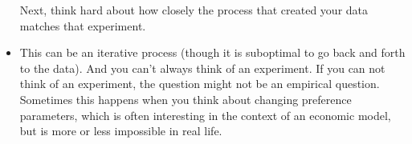 \begin{itemize}[leftmargin=0pt]
  Next, think hard about how closely the process that created your
  data matches that experiment.

\item This can be an iterative process (though it is suboptimal to go
  back and forth to the data).  And you can't always think of an
  experiment.  If you can not think of an experiment, the question
  might not be an empirical question.  Sometimes this happens when you
  think about changing preference parameters, which is often
  interesting in the context of an economic model, but is more or less
  impossible in real life.

\end{itemize}

